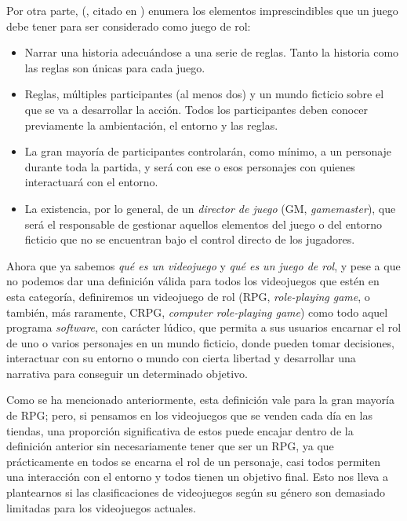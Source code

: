 \smallskip

Por otra parte, \citeauthor{TychsenRPG} (\citeyear{TychsenRPG}, citado en \citet*{RPGH&D}) enumera los elementos imprescindibles que un juego debe tener para ser considerado como juego de rol:
\begin{itemize}
	\item Narrar una historia adecuándose a una serie de reglas. Tanto la historia como las reglas son únicas para cada juego.
	\item Reglas, múltiples participantes (al menos dos) y un mundo ficticio sobre el que se va a desarrollar la acción. Todos los participantes deben conocer previamente la ambientación, el entorno y las reglas.
	\item La gran mayoría de participantes controlarán, como mínimo, a un personaje durante toda la partida, y será con ese o esos personajes con quienes interactuará con el entorno.
	\item La existencia, por lo general, de un \textit{director de juego} (GM, \textit{gamemaster}), que será el responsable de gestionar aquellos elementos del juego o del entorno ficticio que no se encuentran bajo el control directo de los jugadores.
\end{itemize}

\medskip

Ahora que ya sabemos \textit{qué es un videojuego} y \textit{qué es un juego de rol}, y pese a que no podemos dar una definición válida para todos los videojuegos que estén en esta categoría, definiremos un videojuego de rol (RPG, \textit{role-playing game}, o también, más raramente, CRPG, \textit{computer role-playing game}) como todo aquel programa \textit{software}, con carácter lúdico, que permita a sus usuarios encarnar el rol de uno o varios personajes en un mundo ficticio, donde pueden tomar decisiones, interactuar con su entorno o mundo con cierta libertad y desarrollar una narrativa para conseguir un determinado objetivo.

\smallskip

Como se ha mencionado anteriormente, esta definición vale para la gran mayoría de RPG; pero, si pensamos en los videojuegos que se venden cada día en las tiendas, una proporción significativa de estos puede encajar dentro de la definición anterior sin necesariamente tener que ser un RPG, ya que prácticamente en todos se encarna el rol de un personaje, casi todos permiten una interacción con el entorno y todos tienen un objetivo final. Esto nos lleva a plantearnos si las clasificaciones de videojuegos según su género son demasiado limitadas para los videojuegos actuales.

